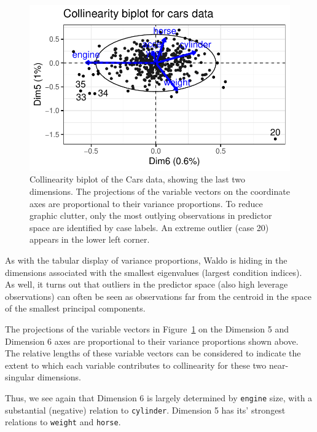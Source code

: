 \documentclass[
  letterpaper,
  10pt,
  krantz2]{krantz}
\begin{document}
\begin{figure}[H]

{\centering \includegraphics[width=1\textwidth,height=\textheight]{figs/fig-cars-collin-biplot-1.pdf}

}

\caption{\label{fig-cars-collin-biplot}Collinearity biplot of the Cars
data, showing the last two dimensions. The projections of the variable
vectors on the coordinate axes are proportional to their variance
proportions. To reduce graphic clutter, only the most outlying
observations in predictor space are identified by case labels. An
extreme outlier (case 20) appears in the lower left corner.}

\end{figure}

As with the tabular display of variance proportions, Waldo is hiding in
the dimensions associated with the smallest eigenvalues (largest
condition indices).\\
As well, it turns out that outliers in the predictor space (also high
leverage observations) can often be seen as observations far from the
centroid in the space of the smallest principal components.

The projections of the variable vectors in
Figure~\ref{fig-cars-collin-biplot} on the Dimension 5 and Dimension 6
axes are proportional to their variance proportions shown above. The
relative lengths of these variable vectors can be considered to indicate
the extent to which each variable contributes to collinearity for these
two near-singular dimensions.

Thus, we see again that Dimension 6 is largely determined by
\texttt{engine} size, with a substantial (negative) relation to
\texttt{cylinder}. Dimension 5 has its' strongest relations to
\texttt{weight} and \texttt{horse}.
\end{document}

